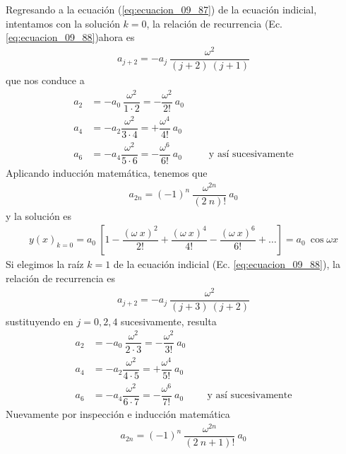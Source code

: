 \par
Regresando a la ecuación (\ref{eq:ecuacion_09_87}) de la ecuación indicial, intentamos con la solución $k = 0$, la relación de recurrencia (Ec. \ref{eq:ecuacion_09_88})ahora es
\begin{align}
a_{j + 2} = - a_{j} \: \dfrac{\omega^{2}}{(j+2) \:(j+1)}
\label{eq:ecuacion_09_89}
\end{align}
que nos conduce a
\begin{align*}
a_{2} &= - a_{0} \: \dfrac{\omega^{2}}{1 \cdot 2} = - \dfrac{\omega^{2}}{2!} \: a_{0} \\
a_{4} &= - a_{2} \dfrac{\omega^{2}}{3 \cdot 4} = + \dfrac{\omega^{4}}{4!} \: a_{0} \\
a_{6} &= - a_{4} \dfrac{\omega^{2}}{5 \cdot 6} = - \dfrac{\omega^{6}}{6!} \: a_{0} \hspace{1cm} \mbox{ y así sucesivamente}
\end{align*}
Aplicando inducción matemática, tenemos que
\begin{align}
a_{2 n} = (-1)^{n} \: \dfrac{\omega^{2 n}}{(2 \: n)!} \: a_{0}
\label{eq:ecuacion_09_90}
\end{align}
y la solución es
\begin{align}
y(x)_{k = 0} = a_{0} \: \left[ 1 - \dfrac{(\omega \: x)^{2}}{2!} + \dfrac{(\omega \: x)^{4}}{4!} - \dfrac{(\omega \: x)^{6}}{6!} + \ldots \right] = a_{0} \: \cos \omega x
\label{eq:ecuacion_09_91}  
\end{align}
Si elegimos la raíz $k = 1$ de la ecuación indicial (Ec. \ref{eq:ecuacion_09_88}), la relación de recurrencia es
\begin{align}
a_{j + 2} = - a_{j} \: \dfrac{\omega^{2}}{(j+3) \: (j+2)}
\label{eq:ecuacion_09_92}
\end{align}
sustituyendo en $j = 0, 2, 4$ sucesivamente, resulta
\begin{align*}
a_{2} &= - a_{0} \: \dfrac{\omega^{2}}{2 \cdot 3} = - \dfrac{\omega^{2}}{3!} \: a_{0} \\
a_{4} &= - a_{2} \dfrac{\omega^{2}}{4 \cdot 5} = + \dfrac{\omega^{4}}{5!}  \: a_{0} \\
a_{6} &= - a_{4} \dfrac{\omega^{2}}{6 \cdot 7} = - \dfrac{\omega^{6}}{7!} \: a_{0} \hspace{1cm} \mbox{y así sucesivamente}
\end{align*}
Nuevamente por inspección e inducción matemática
\begin{align}
a_{2 n} = (-1)^{n} \: \dfrac{\omega^{2 n}}{(2 \: n + 1)!} \: a_{0}
\label{eq:ecuacion_09_93}
\end{align}
